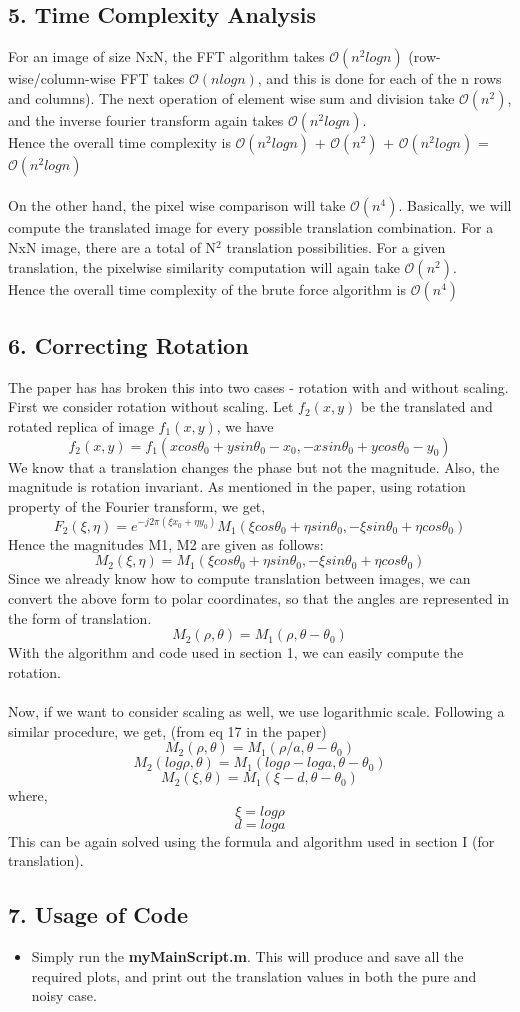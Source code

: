 \documentclass[12pt, a4paper]{article}
\begin{document}
\subsection*{5. Time Complexity Analysis}
For an image of size NxN, the FFT algorithm takes $\mathcal{O}(n^2logn)$ (row-wise/column-wise FFT takes $\mathcal{O}(nlogn)$, and this is done for each of the n rows and columns). The next operation of element wise sum and division take $\mathcal{O}(n^2)$, and the inverse fourier transform again takes $\mathcal{O}(n^2logn)$. \\
Hence the overall time complexity is $\mathcal{O}(n^2logn)$ + $\mathcal{O}(n^2)$ + $\mathcal{O}(n^2logn)$ = $\mathcal{O}(n^2logn)$ \\ \\ 
On the other hand, the pixel wise comparison will take $\mathcal{O}(n^4)$. Basically, we will compute the translated image for every possible translation combination. For a NxN image, there are a total of N$^2$ translation possibilities. For a given translation, the pixelwise similarity computation will again take $\mathcal{O}(n^2)$. \\ Hence the overall time complexity of the brute force algorithm is $\mathcal{O}(n^4)$
\subsection*{6. Correcting Rotation}
The paper has has broken this into two cases - rotation with and without scaling. \\
First we consider rotation without scaling. Let $f_2(x,y)$ be the translated and rotated replica of image $f_1(x,y)$, we have
$$f_2(x,y) = f_1(xcos\theta_0 + ysin\theta_0 - x_0, -xsin\theta_0 + ycos\theta_0 - y_0)$$
We know that a translation changes the phase but not the magnitude. Also, the magnitude is rotation invariant. As mentioned in the paper, using rotation property of the Fourier transform, we get,
$$F_2(\xi ,\eta) = e^{-j2\pi(\xi x_0 + \eta y_0)} M_1(\xi cos\theta_0 + \eta sin\theta_0, -\xi sin\theta_0 + \eta cos\theta_0)$$
Hence the magnitudes M1, M2 are given as follows:
$$M_2(\xi ,\eta) = M_1(\xi cos\theta_0 + \eta sin\theta_0, -\xi sin\theta_0 + \eta cos\theta_0)$$
Since we already know how to compute translation between images, we can convert the above form to polar coordinates, so that the angles are represented in the form of translation.
$$M_2(\rho ,\theta) = M_1(\rho ,\theta-\theta_0)$$
With the algorithm and code used in section 1, we can easily compute the rotation. \\ \\ 
Now, if we want to consider scaling as well, we use logarithmic scale. Following a similar procedure, we get, (from eq 17 in the paper)
$$M_2(\rho ,\theta) = M_1(\rho/a ,\theta-\theta_0)$$
$$M_2(log\rho ,\theta) = M_1(log\rho - loga ,\theta-\theta_0)$$
$$M_2(\xi ,\theta) = M_1(\xi - d ,\theta-\theta_0)$$
where,
$$\xi = log\rho$$
$$d = loga$$
This can be again solved using the formula and algorithm used in section I (for translation).
\subsection*{7. Usage of Code}
\begin{itemize}
\item Simply run the \textbf{myMainScript.m}. This will produce and save all the required plots, and print out the translation values in both the pure and noisy case.
\end{itemize}
\end{document}
